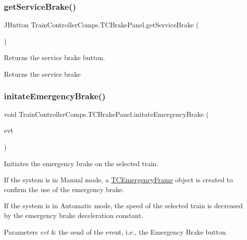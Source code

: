 \subsubsection{\texorpdfstring{get\+Service\+Brake()}{getServiceBrake()}}
{\footnotesize\ttfamily J\+Button Train\+Controller\+Comps.\+T\+C\+Brake\+Panel.\+get\+Service\+Brake (\begin{DoxyParamCaption}{ }\end{DoxyParamCaption})}



Returns the service brake button. 

\begin{DoxyReturn}{Returns}
the service brake 
\end{DoxyReturn}
\mbox{\label{classTrainControllerComps_1_1TCBrakePanel_a88605d5c8969b8c38af57f077a6289ce}} 
\subsubsection{\texorpdfstring{initate\+Emergency\+Brake()}{initateEmergencyBrake()}}
{\footnotesize\ttfamily void Train\+Controller\+Comps.\+T\+C\+Brake\+Panel.\+initate\+Emergency\+Brake (\begin{DoxyParamCaption}\item[{java.\+awt.\+event.\+Action\+Event}]{evt }\end{DoxyParamCaption})\hspace{0.3cm}{\ttfamily [private]}}



Initiates the emergency brake on the selected train. 

If the system is in Manual mode, a \hyperlink{classTrainControllerComps_1_1TCEmergencyFrame}{T\+C\+Emergency\+Frame} object is created to confirm the use of the emergency brake.

If the system is in Automatic mode, the speed of the selected train is decreased by the emergency brake deceleration constant.


\begin{DoxyParams}{Parameters}
{\em evt} & the send of the event, i.\+e., the \textquotesingle{}Emergency Brake\textquotesingle{} button \\
\hline
\end{DoxyParams}
\mbox{\label{classTrainControllerComps_1_1TCBrakePanel_a9de925ba11a22e74716c6009d666b0d2}} 
